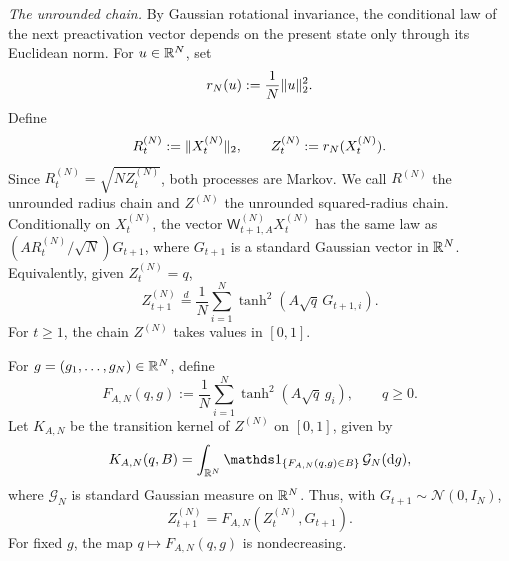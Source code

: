 \documentclass[11pt,reqno,a4paper]{article}
\begin{document}
\emph{The unrounded chain.}
By Gaussian rotational invariance, the conditional law of the next
preactivation vector depends on the present state only through its Euclidean
norm. For $u\in\mathbb{R}^N$, set
\begin{equation*}
  r_N(u):=\frac1N\lVert u\rVert_2^2.
\end{equation*}
Define
\begin{equation*}
  R_t^{(N)}:=\lVert X_t^{(N)}\rVert_2,
  \qquad
  Z_t^{(N)}:=r_N(X_t^{(N)}).
\end{equation*}
Since $R_t^{(N)}=\sqrt{NZ_t^{(N)}}$, both processes are Markov. We call
$R^{(N)}$ the unrounded radius chain and $Z^{(N)}$ the unrounded
squared-radius chain.
Conditionally on $X_t^{(N)}$, the vector
$\mathsf W_{t+1,A}^{(N)}X_t^{(N)}$ has the same law as
$(AR_t^{(N)}/\sqrt N)G_{t+1}$, where $G_{t+1}$ is a standard Gaussian vector in
$\mathbb{R}^N$. Equivalently, given $Z_t^{(N)}=q$,
\begin{equation}\label{eq:q-chain}
  Z_{t+1}^{(N)}
  \stackrel{d}{=}
  \frac1N\sum_{i=1}^N
  \tanh^2\left(A\sqrt{q}\,G_{t+1,i}\right).
\end{equation}
For $t\geq1$, the chain $Z^{(N)}$ takes values in $[0,1]$.

For $g=(g_1,\ldots,g_N)\in\mathbb{R}^N$, define
\begin{equation}\label{eq:gaussian-random-map}
  F_{A,N}(q,g)
  :=
  \frac1N\sum_{i=1}^N \tanh^2(A\sqrt q\,g_i),
  \qquad q\geq0.
\end{equation}
Let $K_{A,N}$ be the transition kernel of $Z^{(N)}$ on $[0,1]$, given by
\begin{equation}\label{eq:gaussian-q-kernel}
  K_{A,N}(q,B)
  =
  \int_{\R^N}
  \one_{\{F_{A,N}(q,g)\in B\}}\,
  \mathcal G_N(\mathrm{d}g),
\end{equation}
where $\mathcal G_N$ is standard Gaussian measure on $\mathbb{R}^N$. Thus, with
$G_{t+1}\sim\mathcal N(0,I_N)$,
\begin{equation}\label{eq:gaussian-random-map-chain}
  Z_{t+1}^{(N)}
  =
  F_{A,N}(Z_t^{(N)},G_{t+1}).
\end{equation}
For fixed $g$, the map $q\mapsto F_{A,N}(q,g)$ is nondecreasing.
\end{document}
